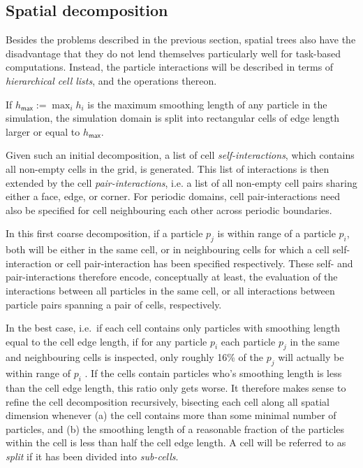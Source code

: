 \documentclass[final]{siamltex}
\begin{document}
\subsection{Spatial decomposition}

Besides the problems described in the previous section,
spatial trees also have the disadvantage that they do not
lend themselves particularly well for task-based computations.
Instead, the particle interactions will be described in
terms of {\em hierarchical cell lists}, and the operations thereon.

If $h_\mathsf{max} := \max_i  h_i $ is the maximum smoothing
length of any particle in the simulation,  the simulation domain
is split into rectangular cells of edge length
larger or equal to $h_\mathsf{max}$.

Given such an initial decomposition,
a list of cell {\em self-interactions}, which contains all
non-empty cells in the grid, is generated.
This list of interactions is then extended by the cell
{\em pair-interactions}, i.e. a list of all non-empty cell pairs
sharing either a face, edge, or corner.
For periodic domains, cell pair-interactions need also be
specified for cell neighbouring each other across
periodic boundaries.

In this first coarse decomposition, if a particle $p_j$
is within range of a particle $p_i$, both will be either
in the same cell, or in neighbouring cells for which a
cell self-interaction or cell pair-interaction has been
specified respectively.
These self- and pair-interactions therefore encode,
conceptually at least,
the evaluation of the interactions between all particles
in the same cell, or all interactions between particle pairs
spanning a pair of cells, respectively.

In the best case, i.e.~if each cell contains
only particles with smoothing length equal to the cell
edge length, if for any particle $p_i$ each
particle $p_j$ in the same and neighbouring cells is
inspected, only roughly 16\% of the $p_j$
will actually be within range of $p_i$ \cite{ref:Gonnet2007}.
If the cells contain particles who's smoothing length
is less than the cell edge length, this ratio only
gets worse.
It therefore makes sense to refine the cell decomposition
recursively, bisecting each cell along
all spatial dimension whenever (a) the cell contains more than
some minimal number of particles, and (b) the smoothing
length of a reasonable fraction of the particles within
the cell is less than half the cell edge length.
A cell will be referred to as {\em split} if it
has been divided into {\em sub-cells}.
\end{document}
